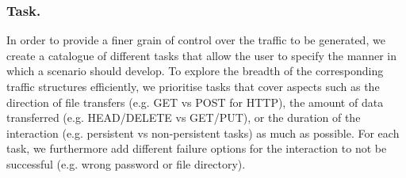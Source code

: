 \documentclass[runningheads]{llncs}
\begin{document}

\subsubsection*{Task.} \label{Sec:Subscenarios}

In order to provide a finer grain of control over the traffic to be generated, we create a catalogue of different tasks that allow the user to specify the manner in which a scenario should develop. %
To explore the breadth of the corresponding traffic structures efficiently, we prioritise tasks that cover aspects such as the direction of file transfers (e.g. GET vs POST for HTTP), the amount of data transferred (e.g. HEAD/DELETE vs GET/PUT), or the duration of the interaction (e.g. persistent vs non-persistent tasks) as much as possible. For each task, we furthermore add different failure options for the interaction to not be successful (e.g. wrong password or file directory). 



\end{document}
